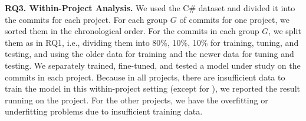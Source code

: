 
\noindent\textbf{RQ3. Within-Project Analysis.}
We used the C\# dataset and divided it into the commits for each
project. For each group $G$ of commits for one project, we sorted them
in the chronological order. For the commits in each group $G$, we
split them as in RQ1, i.e., dividing them into 80\%, 10\%, 10\% for
training, tuning, and testing, and using the older data for training
and the newer data for tuning and testing.
%
We separately trained, fine-tuned, and tested a model under study on
the commits in each project. Because in all projects, there are
insufficient data to train the model in this within-project setting
(except for ), we reported the result running on
the  project. For the other projects, we have the
overfitting or underfitting problems due to insufficient training
data.





